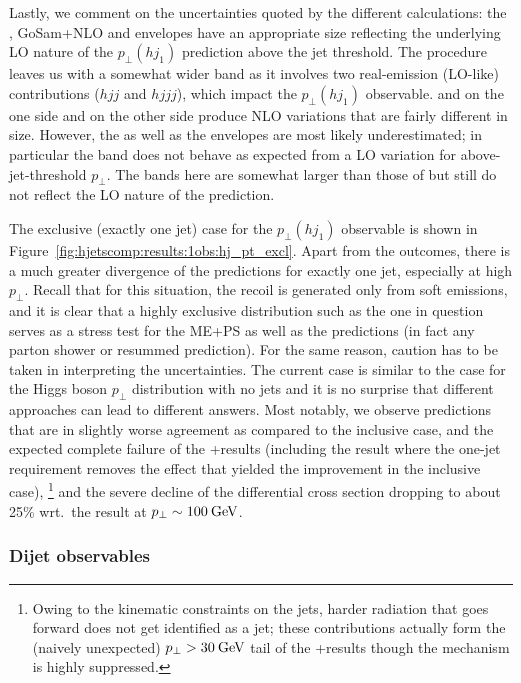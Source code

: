 Lastly, we comment on the uncertainties quoted by the different
calculations: the \Resbos, GoSam{}+\Sherpa NLO and \Minlo envelopes
have an appropriate size reflecting the underlying LO nature of the
$p_\perp(hj_1)$ prediction above the jet threshold. The \Loopsim
procedure leaves us with a somewhat wider band as it involves two
real-emission (LO-like) contributions ($hjj$ and $hjjj$), which impact
the $p_\perp(hj_1)$ observable.
\MGaMC and \Sherpa \MEPSatNLO on the one side and \Herwig on the other
side produce NLO variations that are fairly different in size.
However, the \Herwig as well as the \Powheg envelopes are most likely
underestimated; in particular the \Powheg band does not behave as
expected from a LO variation for above-jet-threshold $p_\perp$. The
\Sherpa \NNLOPS bands here are somewhat larger than those of \Powheg
but still do not reflect the LO nature of the prediction.

The exclusive (exactly one jet) case for the $p_\perp(hj_1)$
observable is shown in Figure~\ref{fig:hjetscomp:results:1obs:hj_pt_excl}.
Apart from the \NNLOPS outcomes, there is a much greater divergence of
the predictions for exactly one jet, especially at high $p_\perp$.
Recall that for this situation, the recoil is generated only from soft emissions, and
it is clear that a highly exclusive distribution such as the one in
question serves as a stress test for the ME+PS as well as the \NNLOPS
predictions (in fact any parton shower or resummed prediction). For
the same reason, caution has to be taken in interpreting the 
uncertainties. The current case is similar to the case for the Higgs
boson $p_\perp$ distribution with no jets and it is no surprise that
different approaches can lead to different answers. Most notably, we
observe \NNLOPS predictions that are in slightly worse agreement as
compared to the inclusive case, and the expected complete failure of the
\GoSam{}+\Sherpa results (including the \Loopsim result where the
one-jet requirement removes the effect that yielded the
improvement in the inclusive case),%
\footnote{Owing to the kinematic constraints on the jets, harder
  radiation that goes forward does not get identified as a jet;
  these contributions actually form the (naively unexpected)
  $p_\perp>30\text{\:GeV}$ tail of the \GoSam{}+\Sherpa results though the
  mechanism is highly suppressed.}
and the severe decline of the \Herwig differential cross section
dropping to about 25\% wrt.~the \Powheg result at $p_\perp\sim100\text{\:GeV}$.



\subsubsection{Dijet observables}
\label{sec:hjetscomp:results:2jobs}

